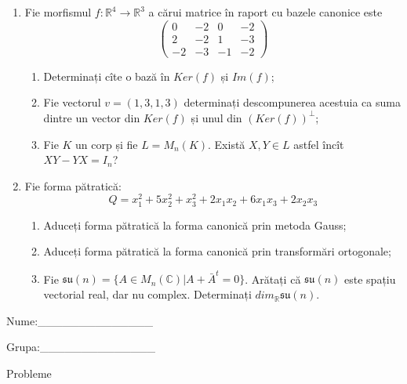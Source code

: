 \documentclass{article}
\begin{document}
\begin{enumerate}
 \item Fie morfismul $f:\mathbb{R}^4 \to \mathbb{R}^3$ a cărui matrice în raport cu bazele canonice este
$$\begin{pmatrix}
0&-2&0&-2\\
2&-2&1&-3\\
-2&-3&-1&-2
\end{pmatrix}$$

\begin{enumerate}
\item Determinați cîte o bază în $Ker(f)$ și $Im(f)$;
\item Fie vectorul $v=(1,3,1,3)$ determinați descompunerea acestuia ca suma dintre un vector din $Ker(f)$ și unul din $(Ker(f))^\perp$;
\item Fie $K$ un corp și fie $L=M_n(K)$. Există $X,Y \in L$ astfel încît $XY-YX=I_n$?  
\end{enumerate}
\item Fie forma pătratică:
$$Q= x_1^2+5x_2^2+x_3^2+2x_1x_2+6x_1x_3+2x_2x_3$$

\begin{enumerate}
\item Aduceți forma pătratică la forma canonică prin metoda Gauss;
\item Aduceți forma pătratică la forma canonică prin transformări ortogonale;
\item Fie $\mathfrak{su}(n)=\{ A \in M_n(\mathbb{C}) | A+\bar{A}^t=0\}$. Arătați că $\mathfrak{su}(n)$ este spațiu vectorial real, dar nu complex.
Determinați $dim_{\mathbb{R}}\mathfrak{su}(n)$.
\end{enumerate}
\end{enumerate}
\newpage
\begin{flushright}
Nume:\_\_\_\_\_\_\_\_\_\_\_\_\_\_
 
 
Grupa:\_\_\_\_\_\_\_\_\_\_\_\_\_\_
\end{flushright}
\begin{center}
\vspace{2cm}
{\Large Probleme}
\vspace{2cm}
\end{center}
\end{document}
